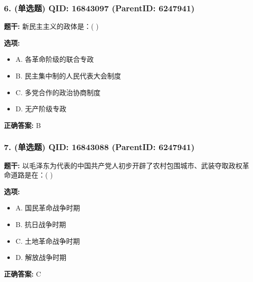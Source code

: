 \documentclass[12pt,UTF8]{ctexart}
\begin{document}
\subsubsection*{6. (单选题) \small QID: 16843097 (ParentID: 6247941)}

\textbf{题干:}
新民主主义的政体是：( )



\textbf{选项:}
\begin{itemize}[leftmargin=*]

  \item A. 各革命阶级的联合专政

  \item B. 民主集中制的人民代表大会制度

  \item C. 多党合作的政治协商制度

  \item D. 无产阶级专政

\end{itemize}

\textbf{正确答案:}
B

\vspace{0.3em}\hrulefill\vspace{0.7em}

\subsubsection*{7. (单选题) \small QID: 16843088 (ParentID: 6247941)}

\textbf{题干:}
以毛泽东为代表的中国共产党人初步开辟了农村包围城市、武装夺取政权革命道路是在：( )



\textbf{选项:}
\begin{itemize}[leftmargin=*]

  \item A. 国民革命战争时期

  \item B. 抗日战争时期

  \item C. 土地革命战争时期

  \item D. 解放战争时期

\end{itemize}

\textbf{正确答案:}
C

\vspace{0.3em}\hrulefill\vspace{0.7em}
\end{document}
